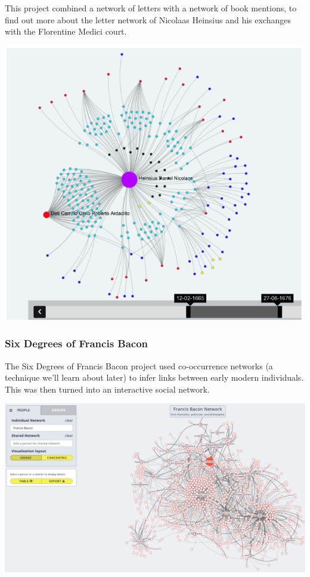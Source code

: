 \documentclass[
]{book}
\begin{document}
This project combined a network of letters with a network of book mentions, to find out more about the letter network of Nicolaas Heinsius and his exchanges with the Florentine Medici court.

\includegraphics[width=5.20833in,height=\textheight]{images/Screenshot 2022-10-03 at 11.23.15.png}

\hypertarget{six-degrees-of-francis-bacon}{%
\subsubsection{Six Degrees of Francis Bacon}\label{six-degrees-of-francis-bacon}}

The Six Degrees of Francis Bacon project used co-occurrence networks (a technique we'll learn about later) to infer links between early modern individuals. This was then turned into an interactive social network.

\includegraphics[width=6.25in,height=\textheight]{images/Screenshot 2022-10-03 at 11.26.54.png}
\end{document}
